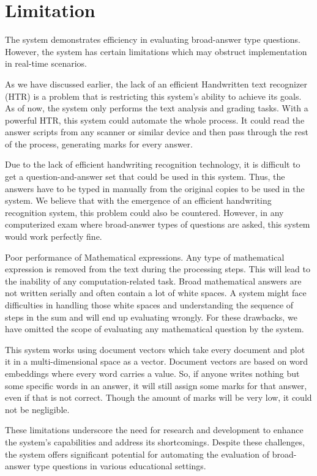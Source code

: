 \section{Limitation}
\par
The system demonstrates efficiency in evaluating broad-answer type questions. However, the system has certain limitations which may obstruct implementation in real-time scenarios.
\par 
As we have discussed earlier, the lack of an efficient Handwritten text recognizer (HTR) is a problem that is restricting this system's ability to achieve its goals. As of now, the system only performs the text analysis and grading tasks. With a powerful HTR, this system could automate the whole process. It could read the answer scripts from any scanner or similar device and then pass through the rest of the process, generating marks for every answer. 
\par 
Due to the lack of efficient handwriting recognition technology, it is difficult to get a question-and-answer set that could be used in this system. Thus, the answers have to be typed in manually from the original copies to be used in the system. We believe that with the emergence of an efficient handwriting recognition system, this problem could also be countered. However, in any computerized exam where broad-answer types of questions are asked, this system would work perfectly fine. 
\par 
Poor performance of Mathematical expressions. Any type of mathematical expression is removed from the text during the processing steps. This will lead to the inability of any computation-related task. Broad mathematical answers are not written serially and often contain a lot of white spaces. A system might face difficulties in handling those white spaces and understanding the sequence of steps in the sum and will end up evaluating wrongly. For these drawbacks, we have omitted the scope of evaluating any mathematical question by the system.
\par 
This system works using document vectors which take every document and plot it in a multi-dimensional space as a vector. Document vectors are based on word embeddings where every word carries a value. So, if anyone writes nothing but some specific words in an answer, it will still assign some marks for that answer, even if that is not correct. Though the amount of marks will be very low, it could not be negligible.
\par 
These limitations underscore the need for research and development to enhance the system's capabilities and address its shortcomings. Despite these challenges, the system offers significant potential for automating the evaluation of broad-answer type questions in various educational settings.

